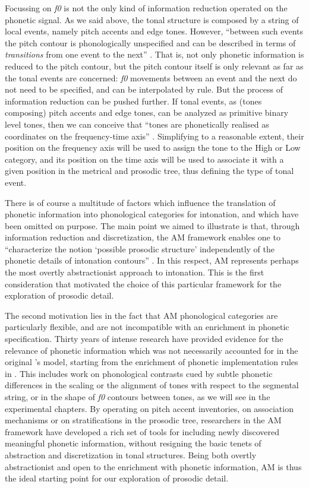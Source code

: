Focussing on \textit{f0} is not the only kind of information reduction operated on the phonetic signal. As we said above, the tonal structure is composed by a string of local events, namely pitch accents and edge tones. However, ``between such events the pitch contour is phonologically unspecified and can be described in terms of \textit{transitions} from one event to the next'' \cite[44]{ladd2008intonational}. That is, not only phonetic information is reduced to the pitch contour, but the pitch contour itself is only relevant as far as the tonal events are concerned: \textit{f0} movements between an event and the next do not need to be specified, and can be interpolated by rule. But the process of information reduction can be pushed further. If tonal events, as (tones composing) pitch accents and edge tones, can be analyzed as primitive binary level tones, then we can conceive that ``tones are phonetically realised as coordinates on the frequency-time axis'' \citep{grice2005german}. Simplifying to a reasonable extent, their position on the frequency axis will be used to assign the tone to the High or Low category, and its position on the time axis will be used to associate it with a given position in the metrical and prosodic tree, thus defining the type of tonal event.

There is of course a multitude of factors which influence the translation of phonetic information into phonological categories for intonation, and which have been omitted on purpose. The main point we aimed to illustrate is that, through information reduction and discretization, the AM framework enables one to ``characterize the notion `possible prosodic structure' independently of the phonetic details of intonation contours'' \cite[123]{gussenhoven2004phonology}. In this respect, AM represents perhaps the most overtly abstractionist approach to intonation. This is the first consideration that motivated the choice of this particular framework for the exploration of prosodic detail. 

The second motivation lies in the fact that AM phonological categories are particularly flexible, and are not incompatible with an enrichment in phonetic specification. Thirty years of intense research have provided evidence for the relevance of phonetic information which was not necessarily accounted for in the original \citeauthor{pierrehumbert1980phonology}'s \citeyearpar{pierrehumbert1980phonology} model, starting from the enrichment of phonetic implementation rules in \citet{pierrehumbert1988japanese}. This includes work on phonological contrasts cued by subtle phonetic differences in the scaling or the alignment of tones with respect to the segmental string, or in the shape of \textit{f0} contours between tones, as we will see in the experimental chapters. By operating on pitch accent inventories, on association mechanisms or on stratifications in the prosodic tree, researchers in the AM framework have developed a rich set of tools for including newly discovered meaningful phonetic information, without resigning the basic tenets of abstraction and discretization in tonal structures. Being both overtly abstractionist and open to the enrichment with phonetic information, AM is thus the ideal starting point for our exploration of prosodic detail.

